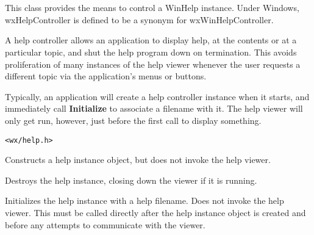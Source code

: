 \section{}\label{wxwinhelpcontroller}

This class provides the means to control a WinHelp instance.
Under Windows, wxHelpController is defined to be a synonym for wxWinHelpController.

A help controller allows an application to display help, at the contents
or at a particular topic, and shut the help program down on termination.
This avoids proliferation of many instances of the help viewer whenever the
user requests a different topic via the application's menus or buttons.

Typically, an application will create a help controller instance
when it starts, and immediately call {\bf Initialize}\rtfsp
to associate a filename with it. The help viewer will only get run, however,
just before the first call to display something.






{\tt <wx/help.h>}




Constructs a help instance object, but does not invoke the help viewer.



Destroys the help instance, closing down the viewer if it is running.

\label{wxwinhelpcontrollerinitialize}


Initializes the help instance with a help filename. Does not invoke the help viewer.
This must be called directly after the help instance object is created and before
any attempts to communicate with the viewer.

